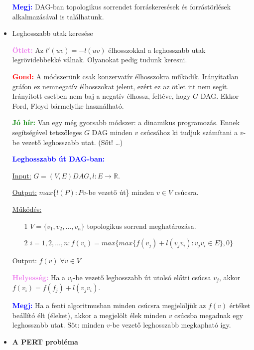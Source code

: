 \documentclass[../../szobeli.tex]{subfiles}
\begin{document}
\begin{itemize}
            \textcolor{blue}{\textbf{Megj:}} DAG-ban topologikus sorrendet forráskeresések és forrástörlések alkalmazásával is találhatunk.

        \item Leghosszabb utak keresése

            \textcolor{violet}{\textbf{Ötlet:}} Az $l'(uv) = -l(uv)$ élhosszokkal a leghosszabb utak legrövidebbekké válnak. Olyanokat pedig tudunk keresni.

            \textcolor{red}{\textbf{Gond:}} A módszerünk csak konzervatív élhosszokra működik. Irányítatlan gráfon ez nemnegatív élhosszokat jelent, ezért ez az ötlet itt nem segít. Irányított esetben nem baj a negatív élhossz, feltéve, hogy $G$ DAG. Ekkor Ford, Floyd bármelyike használható.

            \textcolor{green}{\textbf{Jó hír:}} Van egy még gyorsabb módszer: a dinamikus programozás. Ennek segítségével tetszőleges $G$ DAG minden $v$ csúcsához ki tudjuk számítani a $v$-be vezető leghosszabb utat. (Sőt! \dots)

            \textcolor{blue}{\textbf{Leghosszabb út DAG-ban:}} 
            
            \underline{Input:} $G = (V,E) DAG, l:E \rightarrow \mathbb{R}.$ 
            
            \underline{Output:} $max$\{$l(P):P v$-be vezető út\} minden $v \in V$ csúcsra. 
            
            \underline{Működés:} \begin{itemize}
                \item[$\boxed{1}$] $V = \{v_1,v_2,\dots,v_n\}$ topologikus sorrend meghatározása.
                \item[$\boxed{2}$] $i = 1,2,\dots,n: f(v_i) = max\{max\{f(v_j)+l(v_jv_i):v_jv_i \in E\},0\}$ 
            \end{itemize}
            
            Output: $f(v)\; \forall v \in V$

            \textcolor{violet}{\textbf{Helyesség:}} Ha a $v_i$-be vezető leghosszabb út utolsó előtti csúcsa $v_j$, akkor $f(v_i) = f(f_j) + l(v_jv_i)$.

            \textcolor{blue}{\textbf{Megj:}} Ha a fenti algoritmusban minden csúcsra megjelöljük az $f(v)$ értéket beállító élt (éleket), akkor a megjelölt élek minden $v$ csúcsba megadnak egy leghosszabb utat. Sőt: minden $v$-be vezető leghosszabb megkapható így.

        \item \textbf{A PERT probléma}


\end{itemize}
\end{document}
